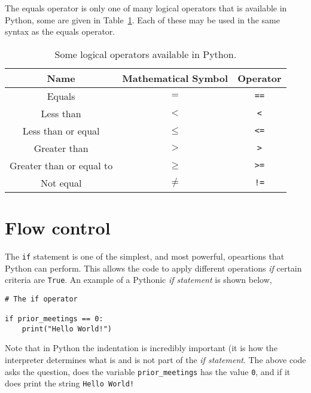 \documentclass[a4paper]{article}
\begin{document}
The equals operator is only one of many logical operators that is available in Python, some are given in Table~\ref{tab:ops}.
Each of these may be used in the same syntax as the equals operator.
\begin{table}[h]
	\centering
	\caption{Some logical operators available in Python.}
	\label{tab:ops}
	\begin{tabular}{c c c}
		\hline
		Name & Mathematical Symbol & Operator \\
		\hline
		Equals & $=$ &\texttt{==} \\
		Less than & $<$ & \texttt{<} \\
		Less than or equal & $\leq$ & \texttt{<=} \\
		Greater than & $>$ & \texttt{>} \\
		Greater than or equal to & $\geq$ & \texttt{>=} \\
		Not equal & $\neq$ & \texttt{!=}  \\
		\hline
	\end{tabular}
\end{table}
\vspace{\baselineskip}
\begin{center}
	\noindent{}
\end{center}

\section{Flow control}

The \texttt{if} statement is one of the simplest, and most powerful, opeartions that Python can perform. 
This allows the code to apply different operations \emph{if} certain criteria are \texttt{True}.
An example of a Pythonic \emph{if statement} is shown below, 
\begin{lstlisting}
# The if operator

if prior_meetings == 0:
    print("Hello World!")
\end{lstlisting}
Note that in Python the indentation is incredibly important (it is how the interpreter determines what is and is not part of the \emph{if statement}.
The above code asks the question, does the variable \texttt{prior\_meetings} has the value \texttt{0}, and if it does print the string \texttt{Hello World!}
\end{document}
